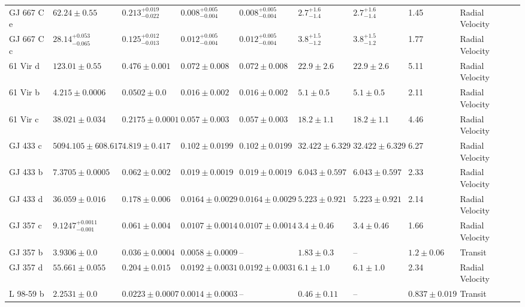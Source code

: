 \begin{tabular}{llllllllll}
GJ 667 C e & $62.24 \pm 0.55$ & $0.213^{+0.019}_{-0.022}$ & $0.008^{+0.005}_{-0.004}$ & $0.008^{+0.005}_{-0.004}$ & $2.7^{+1.6}_{-1.4}$ & $2.7^{+1.6}_{-1.4}$ & 1.45 & Radial Velocity & \cite{ANGLADA_ESCUDE_ET_AL__2013} \\
GJ 667 C c & $28.14^{+0.053}_{-0.065}$ & $0.125^{+0.012}_{-0.013}$ & $0.012^{+0.005}_{-0.004}$ & $0.012^{+0.005}_{-0.004}$ & $3.8^{+1.5}_{-1.2}$ & $3.8^{+1.5}_{-1.2}$ & 1.77 & Radial Velocity & \cite{ANGLADA_ESCUDE_ET_AL__2013} \\
61 Vir d & $123.01 \pm 0.55$ & $0.476 \pm 0.001$ & $0.072 \pm 0.008$ & $0.072 \pm 0.008$ & $22.9 \pm 2.6$ & $22.9 \pm 2.6$ & 5.11 & Radial Velocity & \cite{VOGT_ET_AL__2010} \\
61 Vir b & $4.215 \pm 0.0006$ & $0.0502 \pm 0.0$ & $0.016 \pm 0.002$ & $0.016 \pm 0.002$ & $5.1 \pm 0.5$ & $5.1 \pm 0.5$ & 2.11 & Radial Velocity & \cite{VOGT_ET_AL__2010} \\
61 Vir c & $38.021 \pm 0.034$ & $0.2175 \pm 0.0001$ & $0.057 \pm 0.003$ & $0.057 \pm 0.003$ & $18.2 \pm 1.1$ & $18.2 \pm 1.1$ & 4.46 & Radial Velocity & \cite{VOGT_ET_AL__2010} \\
GJ 433 c & $5094.105 \pm 608.617$ & $4.819 \pm 0.417$ & $0.102 \pm 0.0199$ & $0.102 \pm 0.0199$ & $32.422 \pm 6.329$ & $32.422 \pm 6.329$ & 6.27 & Radial Velocity & \cite{FENG_ET_AL__2020} \\
GJ 433 b & $7.3705 \pm 0.0005$ & $0.062 \pm 0.002$ & $0.019 \pm 0.0019$ & $0.019 \pm 0.0019$ & $6.043 \pm 0.597$ & $6.043 \pm 0.597$ & 2.33 & Radial Velocity & \cite{FENG_ET_AL__2020} \\
GJ 433 d & $36.059 \pm 0.016$ & $0.178 \pm 0.006$ & $0.0164 \pm 0.0029$ & $0.0164 \pm 0.0029$ & $5.223 \pm 0.921$ & $5.223 \pm 0.921$ & 2.14 & Radial Velocity & \cite{FENG_ET_AL__2020} \\
GJ 357 c & $9.1247^{+0.0011}_{-0.001}$ & $0.061 \pm 0.004$ & $0.0107 \pm 0.0014$ & $0.0107 \pm 0.0014$ & $3.4 \pm 0.46$ & $3.4 \pm 0.46$ & 1.66 & Radial Velocity & \cite{LUQUE_ET_AL__2019} \\
GJ 357 b & $3.9306 \pm 0.0$ & $0.036 \pm 0.0004$ & $0.0058 \pm 0.0009$ & -- & $1.83 \pm 0.3$ & -- & $1.2 \pm 0.06$ & Transit & \cite{ODDO_ET_AL__2023} \\
GJ 357 d & $55.661 \pm 0.055$ & $0.204 \pm 0.015$ & $0.0192 \pm 0.0031$ & $0.0192 \pm 0.0031$ & $6.1 \pm 1.0$ & $6.1 \pm 1.0$ & 2.34 & Radial Velocity & \cite{LUQUE_ET_AL__2019} \\
L 98-59 b & $2.2531 \pm 0.0$ & $0.0223 \pm 0.0007$ & $0.0014 \pm 0.0003$ & -- & $0.46 \pm 0.11$ & -- & $0.837 \pm 0.019$ & Transit & \cite{CADIEUX_ET_AL_2025} \\

\end{tabular}
